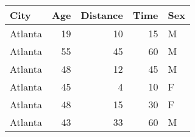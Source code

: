 \begin{knitrout}
\color{fgcolor}\begin{kframe}
\begin{alltt}
 \hlkwb{<-} \hlstd{(}\hlstd{)}
\hlstd{(}
\end{alltt}
\end{kframe}
\begin{tabular}{l|r|r|r|l}
\hline
City & Age & Distance & Time & Sex\\
\hline
Atlanta & 19 & 10 & 15 & M\\
\hline
Atlanta & 55 & 45 & 60 & M\\
\hline
Atlanta & 48 & 12 & 45 & M\\
\hline
Atlanta & 45 & 4 & 10 & F\\
\hline
Atlanta & 48 & 15 & 30 & F\\
\hline
Atlanta & 43 & 33 & 60 & M\\
\hline
\end{tabular}


\end{knitrout}
